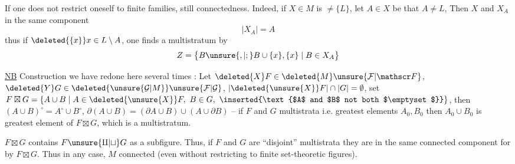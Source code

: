 If one does not restrict oneself to finite families,  still connectedness. Indeed, if $X\in M$ is $\ne\{L\}$, let $A\in X$ be  that $A\ne L$, Then $X$ and $X_A$ in the same component 
\[
\lvert X_A\rvert=A
\]
thus if $\deleted{\{x\}}x\in L\setminus A$, one finds a multistratum by 
\[
Z=\bigl\{B\unsure{,|;}B\cup\{x\},\{x\}\mid B\in X_A\bigr\}
\]

\uline{NB} Construction we have redone here several times : Let $\deleted{X}F\in\deleted{M}\unsure{\mathcal F|\mathscr F}$, $\deleted{Y}G\in\deleted{\unsure{\mathcal G|M}}\unsure{\mathcal F|\mathcal G}$, $\lvert\deleted{\unsure{X}}F\rvert\cap\lvert G\rvert=\emptyset$, set $F\boxtimes G=\{A\cup B\mid A\in\deleted{\unsure{X}}F,\ B\in G,\ \inserted{\text{$A$ and $B$ not both $\emptyset$}}\}$, then $(A\cup B)^{\circ}=A^{\circ}\cup B^{\circ}$, $\partial(A\cup B)=(\partial A\cup B)\cup(A\cup\partial B)$ -- if $F$ and $G$   multistrata i.e.   greatest elements  $A_0,B_0$ then $A_0\cup B_0$ is greatest element of $F\boxtimes G$, which is a multistratum.

 $F\boxtimes G$ contains $F\unsure{\amalg|\sqcup}G$ as a subfigure. Thus, if $F$ and $G$ are ``disjoint'' multistrata they are in the same connected component for  by $F\boxtimes G$. Thus in any case, \margin{)} $M$ connected (even without restricting  to finite set-theoretic  figures).
